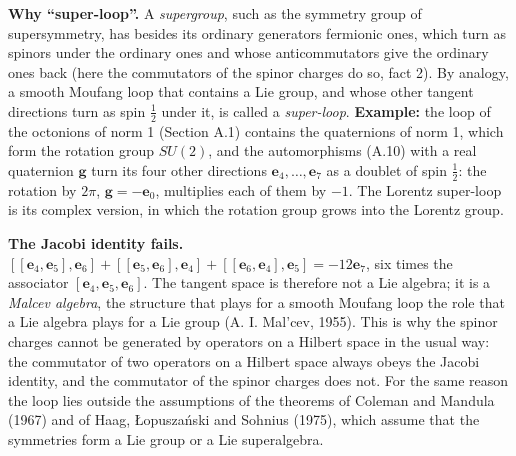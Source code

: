 \documentclass[
  10pt,
]{article}
\begin{document}
\textbf{Why ``super-loop''.} A \emph{supergroup}, such as the symmetry
group of supersymmetry, has besides its ordinary generators fermionic
ones, which turn as spinors under the ordinary ones and whose
anticommutators give the ordinary ones back (here the commutators of the
spinor charges do so, fact 2). By analogy, a smooth Moufang loop that
contains a Lie group, and whose other tangent directions turn as spin
\(\tfrac12\) under it, is called a \emph{super-loop}. \textbf{Example:}
the loop of the octonions of norm 1 (Section A.1) contains the
quaternions of norm 1, which form the rotation group \(SU(2)\), and the
automorphisms (A.10) with a real quaternion \(\mathbf g\) turn its four
other directions \(\mathbf e_4,\dots,\mathbf e_7\) as a doublet of spin
\(\tfrac12\): the rotation by \(2\pi\), \(\mathbf g=-\mathbf e_0\),
multiplies each of them by \(-1\). The Lorentz super-loop is its complex
version, in which the rotation group grows into the Lorentz group.

\textbf{The Jacobi identity fails.}
\([[\mathbf e_4,\mathbf e_5],\mathbf e_6]+[[\mathbf e_5,\mathbf e_6],\mathbf e_4]+[[\mathbf e_6,\mathbf e_4],\mathbf e_5]=-12\mathbf e_{7}\),
six times the associator \([\mathbf e_4,\mathbf e_5,\mathbf e_6]\). The
tangent space is therefore not a Lie algebra; it is a \emph{Malcev
algebra}, the structure that plays for a smooth Moufang loop the role
that a Lie algebra plays for a Lie group (A. I. Mal'cev, 1955). This is
why the spinor charges cannot be generated by operators on a Hilbert
space in the usual way: the commutator of two operators on a Hilbert
space always obeys the Jacobi identity, and the commutator of the spinor
charges does not. For the same reason the loop lies outside the
assumptions of the theorems of Coleman and Mandula (1967) and of Haag,
Łopuszański and Sohnius (1975), which assume that the symmetries form a
Lie group or a Lie superalgebra.
\end{document}
